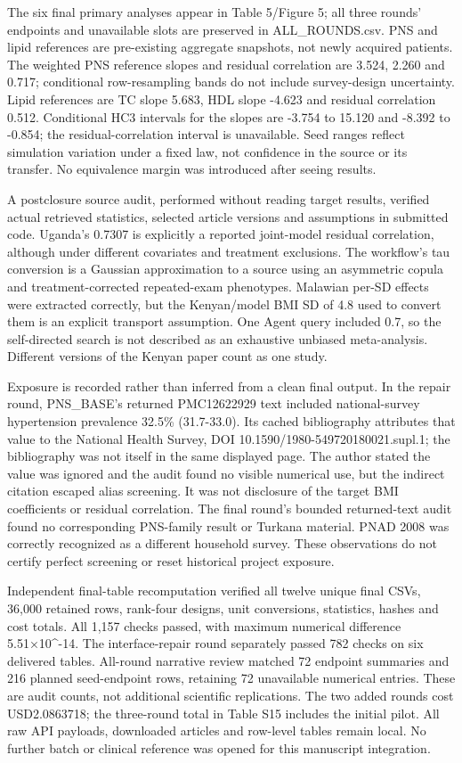 \documentclass[11pt,letterpaper]{article}
\begin{document}
The six final primary analyses appear in Table 5/\allowbreak{}Figure 5; all three rounds' endpoints and unavailable slots are preserved in ALL\_ROUNDS.csv. PNS and lipid references are pre-existing aggregate snapshots, not newly acquired patients. The weighted PNS reference slopes and residual correlation are 3.524, 2.260 and 0.717; conditional row-resampling bands do not include survey-design uncertainty. Lipid references are TC slope 5.683, HDL slope -4.623 and residual correlation 0.512. Conditional HC3 intervals for the slopes are -3.754 to 15.120 and -8.392 to -0.854; the residual-correlation interval is unavailable. Seed ranges reflect simulation variation under a fixed law, not confidence in the source or its transfer. No equivalence margin was introduced after seeing results.


A postclosure source audit, performed without reading target results, verified actual retrieved statistics, selected article versions and assumptions in submitted code. Uganda's 0.7307 is explicitly a reported joint-model residual correlation, although under different covariates and treatment exclusions. The workflow's tau conversion is a Gaussian approximation to a source using an asymmetric copula and treatment-corrected repeated-exam phenotypes. Malawian per-SD effects were extracted correctly, but the Kenyan/\allowbreak{}model BMI SD of 4.8 used to convert them is an explicit transport assumption. One Agent query included 0.7, so the self-directed search is not described as an exhaustive unbiased meta-analysis. Different versions of the Kenyan paper count as one study.


Exposure is recorded rather than inferred from a clean final output. In the repair round, PNS\_BASE's returned PMC12622929 text included national-survey hypertension prevalence 32.5\% (31.7-33.0). Its cached bibliography attributes that value to the National Health Survey, DOI 10.1590/\allowbreak{}1980-549720180021.supl.1; the bibliography was not itself in the same displayed page. The author stated the value was ignored and the audit found no visible numerical use, but the indirect citation escaped alias screening. It was not disclosure of the target BMI coefficients or residual correlation. The final round's bounded returned-text audit found no corresponding PNS-family result or Turkana material. PNAD 2008 was correctly recognized as a different household survey. These observations do not certify perfect screening or reset historical project exposure.


Independent final-table recomputation verified all twelve unique final CSVs, 36,000 retained rows, rank-four designs, unit conversions, statistics, hashes and cost totals. All 1,157 checks passed, with maximum numerical difference 5.51×10\textasciicircum{}-14. The interface-repair round separately passed 782 checks on six delivered tables. All-round narrative review matched 72 endpoint summaries and 216 planned seed-endpoint rows, retaining 72 unavailable numerical entries. These are audit counts, not additional scientific replications. The two added rounds cost USD2.0863718; the three-round total in Table S15 includes the initial pilot. All raw API payloads, downloaded articles and row-level tables remain local. No further batch or clinical reference was opened for this manuscript integration.
\end{document}
